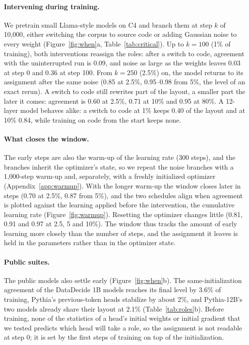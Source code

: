 \documentclass[11pt]{article}
\begin{document}


\paragraph{Intervening during training.}
We pretrain small Llama-style models on C4 and branch them at step $k$ of 10{,}000, either switching the corpus to source code or adding Gaussian noise to every weight (Figure~\ref{fig:when}a, Table~\ref{tab:critical}).
Up to $k = 100$ (1\% of training), both interventions reassign the roles: after a switch to code, agreement with the uninterrupted run is 0.09, and noise as large as the weights leaves 0.03 at step 0 and 0.36 at step 100.
From $k = 250$ (2.5\%) on, the model returns to its assignment after the same noise (0.85 at 2.5\%, 0.95--0.98 from 5\%, the level of an exact rerun).
A switch to code still rewrites part of the layout, a smaller part the later it comes: agreement is 0.60 at 2.5\%, 0.71 at 10\% and 0.95 at 80\%.
A 12-layer model behaves alike: a switch to code at 1\% keeps 0.40 of the layout and at 10\% 0.84, while training on code from the start keeps none.

\paragraph{What closes the window.}
The early steps are also the warm-up of the learning rate (300 steps), and the branches inherit the optimizer's state, so we repeat the noise branches with a 1{,}000-step warm-up and, separately, with a freshly initialized optimizer (Appendix~\ref{app:warmup}).
With the longer warm-up the window closes later in steps (0.70 at 2.5\%, 0.87 from 5\%), and the two schedules align when agreement is plotted against the learning applied before the intervention, the cumulative learning rate (Figure~\ref{fig:warmup}).
Resetting the optimizer changes little (0.81, 0.91 and 0.97 at 2.5, 5 and 10\%).
The window thus tracks the amount of early learning more closely than the number of steps, and the assignment it leaves is held in the parameters rather than in the optimizer state.

\paragraph{Public suites.}
The public models also settle early (Figure~\ref{fig:when}b).
The same-initialization agreement of the DataDecide 1B models reaches its final level by 3.6\% of training, Pythia's previous-token heads stabilize by about 2\%, and Pythia-12B's two models already share their layout at 2.1\% (Table~\ref{tab:roles}b).
Before training, none of the statistics of a head's initial weights or initial gradient that we tested predicts which head will take a role, so the assignment is not readable at step 0; it is set by the first steps of training on top of the initialization.
\end{document}
